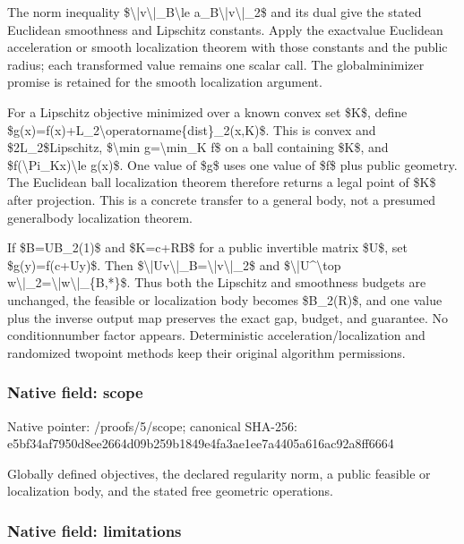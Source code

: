 \documentclass[10pt,a4paper]{article}
\begin{document}
The norm inequality \$\textbackslash{}|v\textbackslash{}|\_B\textbackslash{}le a\_B\textbackslash{}|v\textbackslash{}|\_2\$ and its dual give the stated Euclidean smoothness and Lipschitz constants. Apply the exactvalue Euclidean acceleration or smooth localization theorem with those constants and the public radius; each transformed value remains one scalar call. The globalminimizer promise is retained for the smooth localization argument.

For a Lipschitz objective minimized over a known convex set \$K\$, define \$g(x)=f(x)+L\_2\textbackslash{}operatorn\allowbreak{}ame\{dist\}\_2(x,K)\$. This is convex and \$2L\_2\$Lipschitz, \$\textbackslash{}min g=\textbackslash{}min\_K f\$ on a ball containing \$K\$, and \$f(\textbackslash{}Pi\_Kx)\textbackslash{}le g(x)\$. One value of \$g\$ uses one value of \$f\$ plus public geometry. The Euclidean ball localization theorem therefore returns a legal point of \$K\$ after projection. This is a concrete transfer to a general body, not a presumed generalbody localization theorem.

If \$B=UB\_2(1)\$ and \$K=c+RB\$ for a public invertible matrix \$U\$, set \$g(y)=f(c+Uy)\$. Then \$\textbackslash{}|Uv\textbackslash{}|\_B=\textbackslash{}|v\textbackslash{}|\_2\$ and \$\textbackslash{}|U\textasciicircum{}\textbackslash{}top w\textbackslash{}|\_2=\textbackslash{}|w\textbackslash{}|\_\{B,*\}\$. Thus both the Lipschitz and smoothness budgets are unchanged, the feasible or localization body becomes \$B\_2(R)\$, and one value plus the inverse output map preserves the exact gap, budget, and guarantee. No conditionnumber factor appears. Deterministic acceleration/localization and randomized twopoint methods keep their original algorithm permissions.


\subsubsection{Native field: scope}


Native pointer: /proofs/5/scope; canonical SHA-256: e5bf34af7950d8ee2664d09b\allowbreak{}259b1849e4fa3ae1ee7a4405\allowbreak{}a616ac92a8ff6664


Globally defined objectives, the declared regularity norm, a public feasible or localization body, and the stated free geometric operations.


\subsubsection{Native field: limitations}
\end{document}
